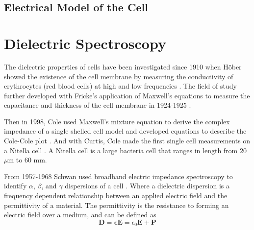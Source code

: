  
 \subsection{Electrical Model of the Cell}
 
 
 \section{Dielectric Spectroscopy}

 
 \par The dielectric properties of cells have been investigated since 1910 when H\"{o}ber showed the existence of the cell membrane by measuring the conductivity of erythrocytes (red blood cells) at high and low frequencies \cite{hober_r_methode_1910}. The field of study further developed with Fricke's application of Maxwell's equations to measure the capacitance and thickness of the cell membrane in 1924-1925 \cite{james_clerk_maxwell_treatise_1892, fricke_h_mathematical_1924, fricke_h_electric_1924, fricke_h_electric_1931}. 
 
 \par Then in 1998, Cole used Maxwell's mixture equation to derive the complex impedance of a single shelled cell model and developed equations to describe the Cole-Cole plot \cite{cole_electric_1928}. And with Curtis, Cole made the first single cell measurements on a Nitella cell \cite{curtis_transverse_1937}. A Nitella cell is a large bacteria cell that ranges in length from 20 $\mu$m to 60 mm. 
 
 \par From 1957-1968 Schwan used broadband electric impedance spectroscopy to identify $\alpha$, $\beta$, and $\gamma$ dispersions of a cell \cite{schwan_h_p_electrical_1957,schwan_h_p_electrical_1963,schwan_electrical_1994}. Where a dielectric dispersion is a frequency dependent relationship between an applied electric field and the permittivity of a material. The permittivity is the resistance to forming an electric field over a medium, and can be defined as
 \begin{equation}
     \textbf{D} = \boldsymbol{\epsilon} \textbf{E} = \epsilon_0 \textbf{E} + \textbf{P}
     \label{eqn:dielectric_displacement}
 \end{equation}
 
